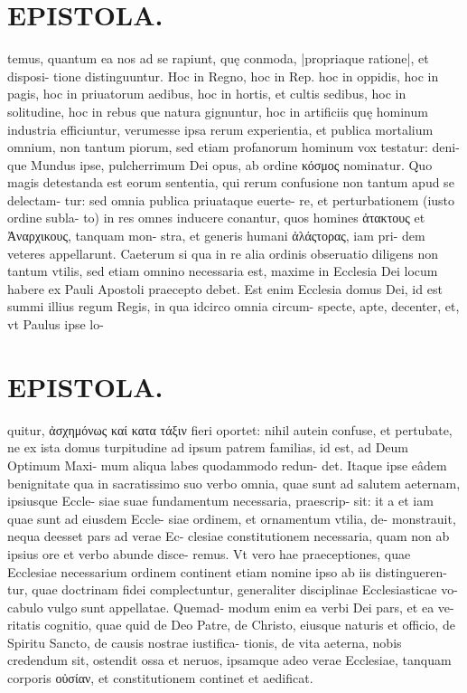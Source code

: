 \documentclass{article}
\begin{document}
\begin{pages}
\section*{EPISTOLA. }temus, quantum ea nos ad se rapiunt, quę conmoda, |propriaque ratione|, et disposi- tione distinguuntur. Hoc in Regno, hoc in Rep. hoc in oppidis, hoc in pagis, hoc in priuatorum aedibus, hoc in hortis, et cultis sedibus, hoc in solitudine, hoc in rebus que natura gignuntur, hoc in artificiis quę hominum industria efficiuntur, verumesse ipsa rerum experientia, et publica mortalium omnium, non tantum piorum, sed etiam profanorum hominum vox testatur: deni- que Mundus ipse, pulcherrimum Dei opus, ab ordine κόσμος nominatur. Quo magis detestanda est eorum sententia, qui rerum confusione non tantum apud se delectam- tur: sed omnia publica priuataque euerte- re, et perturbationem (iusto ordine subla- to) in res omnes inducere conantur, quos homines ἀτακτους et Ἀναρχικους, tanquam mon- stra, et generis humani ἀλάςτορας, iam pri- dem veteres appellarunt. Caeterum si qua in re alia ordinis obseruatio diligens non tantum vtilis, sed etiam omnino necessaria est, maxime in Ecclesia Dei locum habere ex Pauli Apostoli praecepto debet. Est enim Ecclesia domus Dei, id est summi illius regum Regis, in qua idcirco omnia circum- specte, apte, decenter, et, vt Paulus ipse lo- 
\section*{EPISTOLA. }quitur, ἀσχημόνως καί κατα τάξιν fieri oportet: nihil autein confuse, et pertubate, ne ex ista domus turpitudine ad ipsum patrem familias, id est, ad Deum Optimum Maxi- mum aliqua labes quodammodo redun- det. Itaque ipse eâdem benignitate qua in sacratissimo suo verbo omnia, quae sunt ad salutem aeternam, ipsiusque Eccle- siae suae fundamentum necessaria, praescrip- sit: it a et iam quae sunt ad eiusdem Eccle- siae ordinem, et ornamentum vtilia, de- monstrauit, nequa deesset pars ad verae Ec- clesiae constitutionem necessaria, quam non ab ipsius ore et verbo abunde disce- remus. Vt vero hae praeceptiones, quae Ecclesiae necessarium ordinem continent etiam nomine ipso ab iis distingueren- tur, quae doctrinam fidei complectuntur, generaliter disciplinae Ecclesiasticae vo- cabulo vulgo sunt appellatae. Quemad- modum enim ea verbi Dei pars, et ea ve- ritatis cognitio, quae quid de Deo Patre, de Christo, eiusque naturis et officio, de Spiritu Sancto, de causis nostrae iustifica- tionis, de vita aeterna, nobis credendum sit, ostendit ossa et neruos, ipsamque adeo verae Ecclesiae, tanquam corporis οὐσίαν, et constitutionem continet et aedificat. 

\end{pages}
\end{document}
